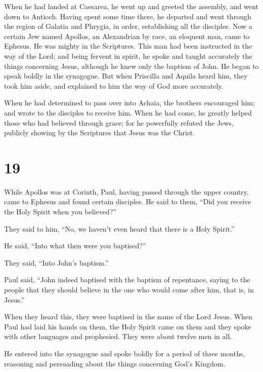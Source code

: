  When he had landed at Caesarea, he went up and greeted
the assembly, and went down to Antioch.  Having spent
some time there, he departed and went through the region of Galatia and
Phrygia, in order, establishing all the disciples.  Now a
certain Jew named Apollos, an Alexandrian by race, an eloquent man, came
to Ephesus. He was mighty in the Scriptures.  This man
had been instructed in the way of the Lord; and being fervent in spirit,
he spoke and taught accurately the things concerning Jesus, although he
knew only the baptism of John.  He began to speak boldly
in the synagogue. But when Priscilla and Aquila heard him, they took him
aside, and explained to him the way of God more accurately.

 When he had determined to pass over into Achaia, the
brothers encouraged him; and wrote to the disciples to receive him. When
he had come, he greatly helped those who had believed through grace;
 for he powerfully refuted the Jews, publicly showing by
the Scriptures that Jesus was the Christ.

\hypertarget{section-18}{%
\section{19}\label{section-18}}

 While Apollos was at Corinth, Paul, having passed through
the upper country, came to Ephesus and found certain disciples.
 He said to them, ``Did you receive the Holy Spirit when
you believed?''

They said to him, ``No, we haven't even heard that there is a Holy
Spirit.''

 He said, ``Into what then were you baptised?''

They said, ``Into John's baptism.''

 Paul said, ``John indeed baptised with the baptism of
repentance, saying to the people that they should believe in the one who
would come after him, that is, in Jesus.''

 When they heard this, they were baptised in the name of
the Lord Jesus.  When Paul had laid his hands on them, the
Holy Spirit came on them and they spoke with other languages and
prophesied.  They were about twelve men in all.

 He entered into the synagogue and spoke boldly for a
period of three months, reasoning and persuading about the things
concerning God's Kingdom.

